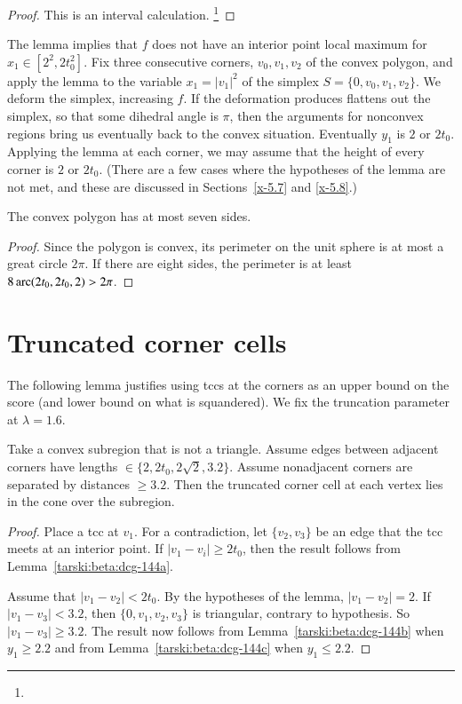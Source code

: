 \begin{proof} This is an interval calculation.%
\footnote{} %
\end{proof}

The lemma implies that $f$ does not have an interior point local maximum
for $x_1\in[2^2,2t_0^2]$.  Fix three consecutive corners, $v_0,v_1,v_2$
of the convex polygon, and apply the lemma to the variable $x_1 =
|v_1|^2$ of the simplex $S=\{0,v_0,v_1,v_2\}$. We deform the simplex,
increasing $f$.  If the deformation produces flattens out the simplex, 
so that some
dihedral angle is $\pi$, then the arguments for nonconvex regions bring
us eventually back to the convex situation. Eventually $y_1$ is $2$ or
$2t_0$.  Applying the lemma at each corner, we may assume that the
height of every corner is $2$ or $2t_0$.   (There are a few cases where
the hypotheses of the lemma are not met, and these are discussed in
Sections~\ref{x-5.7} and \ref{x-5.8}.)

\begin{lemma}
    \label{lemma:7-sides}
The convex polygon has at most seven sides.
\end{lemma}

\begin{proof}
Since the polygon is convex, its perimeter on the unit sphere is at
most a great circle $2\pi$.  If there are eight sides, the perimeter
is at least $8\operatorname{arc}(2t_0,2t_0,2)>2\pi$.
\end{proof}

\section{Truncated corner cells} %

The following lemma justifies using tccs at the corners as an upper
bound on the score (and lower bound on what is squandered). We fix the
truncation parameter at $\lambda=1.6$.

\begin{lemma}
Take a convex subregion that is not a triangle.  Assume edges between
adjacent corners have lengths $\in\{2,2t_0,2\sqrt{2},3.2\}$. Assume
nonadjacent corners are separated by distances $\ge3.2$.  Then the
truncated corner cell at each vertex lies in the cone over the
subregion.
\end{lemma}

\begin{proof}
Place a tcc at $v_1$. For a contradiction, let $\{v_2,v_3\}$ be an
edge that the tcc meets at an interior point.  
If $|v_1-v_i|\ge 2t_0$, then the result follows from
Lemma~\ref{tarski:beta:dcg-144a}.  

Assume that
 $|v_1-v_2|<2t_0$.  By the hypotheses of the lemma,
$|v_1-v_2|=2$.  If $|v_1-v_3|<3.2$, then $\{0,v_1,v_2,v_3\}$ is
triangular, contrary to hypothesis.  So $|v_1-v_3|\ge3.2$.
The result now follows from Lemma~\ref{tarski:beta:dcg-144b} when
$y_1\ge 2.2$ and from Lemma~\ref{tarski:beta:dcg-144c} when
$y_1\le 2.2$.
\end{proof}


